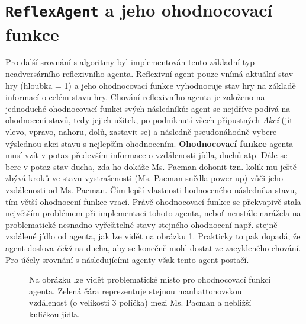 \section{\texttt{ReflexAgent} a jeho ohodnocovací funkce}
Pro další srovnání s algoritmy byl implementován tento základní typ neadversárního reflexivního agenta. Reflexivní agent pouze vnímá aktuální stav hry (hloubka = 1) a jeho ohodnocovací funkce vyhodnocuje stav hry na základě informací o celém stavu hry. Chování reflexivního agenta je založeno na jednoduché ohodnocovací funkci svých následníků: agent se nejdříve podívá na ohodnocení stavů, tedy jejich užitek, po podniknutí všech přípustných \textit{Akcí} (jít vlevo, vpravo, nahoru, dolů, zastavit se) a následně pseudonáhodně vybere výslednou akci stavu s nejlepším ohodnocením.
\textbf{Ohodnocovací funkce} agenta musí vzít v potaz především informace o vzdálenosti jídla, duchů atp. Dále se bere v potaz stav ducha, zda ho dokáže Ms. Pacman dohonit tzn. kolik mu ještě zbývá kroků ve stavu vystrašenosti (Ms. Pacman snědla power-up) vůči jeho vzdálenosti od Ms. Pacman. Čím lepší vlastnosti hodnoceného následníka stavu, tím větší ohodnocení funkce vrací. 
Právě ohodnocovací funkce se překvapivě stala největším problémem při implementaci tohoto agenta, neboť neustále narážela na problematické nesnadno vyřešitelné stavy stejného ohodnocení např. stejně vzdálené jídlo od agenta, jak lze vidět na obrázku \ref{img:reflexthrashV}. Prakticky to pak dopadá, že agent doslova \textit{čeká} na ducha, aby se konečně mohl dostat ze zacykleného chování. Pro účely srovnání s následujícími agenty však tento agent postačí.

\begin{figure}[!htbp]
\begin{center}
  \caption{Na obrázku lze vidět problematické místo pro ohodnocovací funkci agenta. Zelená čára reprezentuje stejnou manhattonovskou vzdálenost (o velikosti 3 políčka) mezi Ms. Pacman a nebližší kuličkou jídla.}
  \label{img:reflexthrashV}
\end{center}
\end{figure}

